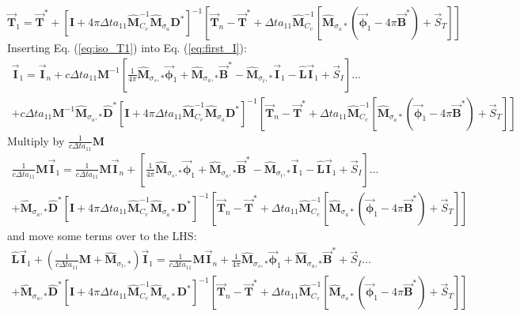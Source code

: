 \documentclass[11pt]{article}
\newcommand{\benum}{\begin{equation}}
\newcommand{\eenum}{\end{equation}}
\newcommand{\eqt}[1]{Eq. (\ref{#1})}
\newcommand{\vect}[1]{\ensuremath{ \vec{\mathbf #1}}}
\newcommand{\M}{\ensuremath{ \mathbf M}}
\newcommand{\Mw}{\ensuremath{\widehat{\mathbf M}}}
\begin{document}
%
%
%
%
\benum
\vect{T}_1 = \vect{T}^* + \left[\mathbf{I} + 4\pi\Delta t a_{11}  \Mw_{C_v}^{-1}\Mw_{\sigma_a}\mathbf{D}^* \right]^{-1}\left[\vect{T}_n - \vect{T}^* +  \Delta t a_{11}  \Mw_{C_v}^{-1}\left[ \Mw_{\sigma_a*} \left(\vect{\phi}_1 - 4\pi\vect{B}^*\right) + \vec{S}_{T}\right]\right]
\label{eq:iso_T1}
\eenum
%
%
Inserting \eqt{eq:iso_T1} into \eqt{eq:first_I}:
\begin{multline*}
\vect{I}_1 = \vect{I}_n + c\Delta t a_{11}\mathbf{M}^{-1}\left[   
\frac{1}{4\pi}\widehat{ \mathbf M}_{\sigma_s,*}\vect{\phi}_1 + \widehat{\mathbf M}_{\sigma_a,*}\vect{B}^* - \widehat{\mathbf M}_{\sigma_t,*} \vect{I}_1 - \widehat{ \mathbf L}\vect{I}_1  + \vec{S}_I \right] \dots  \\
+ c \Delta t a_{11}\M^{-1} \Mw_{\sigma_a,*}\widehat{\mathbf D}^* 
\left[\mathbf{I} + 4\pi\Delta t a_{11}  \Mw_{C_v}^{-1}\Mw_{\sigma_a}\mathbf{D}^*   \right]^{-1}
\left[\vect{T}_n - \vect{T}^* +  \Delta t a_{11} \Mw_{C_v}^{-1}\left[ \Mw_{\sigma_a*} \left(\vect{\phi}_1 - 4\pi\vect{B}^*\right) + \vec{S}_T \right]\right] 
\end{multline*}
%
%
%
Multiply by $\frac{1}{c\Delta t a_{11}}\mathbf{M}$
\begin{multline*}
\frac{1}{c\Delta t a_{11}}\M\vect{I}_1 = \frac{1}{c\Delta t a_{11}}\M\vect{I}_n + \left[   
\frac{1}{4\pi}\Mw_{\sigma_s,*}\vect{\phi}_1 + \Mw_{\sigma_a,*}\vect{B}^* - \Mw_{\sigma_t,*} \vect{I}_1 - \widehat{ \mathbf L}\vect{I}_1  + \vec{S}_I \right] \dots  \\
+ \Mw_{\sigma_a,*}
\widehat{\mathbf D}^* 
\left[\mathbf{I} + 4\pi\Delta t a_{11}  \Mw_{C_v}^{-1}\Mw_{\sigma_a*}\mathbf{D}^*   \right]^{-1}
\left[\vect{T}_n - \vect{T}^* +  \Delta t a_{11} \Mw_{C_v}^{-1}\left[ \Mw_{\sigma_a*} \left(\vect{\phi}_1 - 4\pi\vect{B}^*\right) + \vec{S}_T\right]\right] 
\end{multline*}
%
%
%
and move some terms over to the LHS:
\begin{multline*}
\widehat{ \mathbf L}\vect{I}_1 + \left(\frac{1}{c\Delta t a_{11}} \M + \Mw_{\sigma_t,*} \right)\vect{I}_1 = \frac{1}{c\Delta t a_{11}}\mathbf{M}\vect{I}_n +   
\frac{1}{4\pi}\Mw_{\sigma_s,*}\vect{\phi}_1 + \Mw_{\sigma_a,*}\vect{B}^* + \vec{S}_I \dots  \\
+ \Mw_{\sigma_a,*} \widehat{\mathbf D}^* \left[\mathbf{I} + 4\pi\Delta t a_{11}  \Mw_{C_v}^{-1}\Mw_{\sigma_a*}\mathbf{D}^*   \right]^{-1}
\left[\vect{T}_n - \vect{T}^* +  \Delta t a_{11}  \Mw_{C_v}^{-1}\left[ \Mw_{\sigma_a*} \left(\vect{\phi}_1 - 4\pi\vect{B}^*\right) + \vec{S}_T\right]\right] 
\end{multline*}
\end{document}
